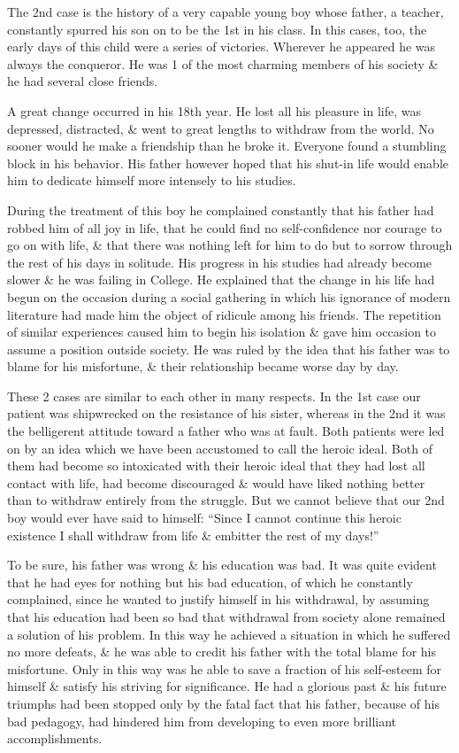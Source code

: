 \documentclass{article}
\begin{document}
The 2nd case is the history of a very capable young boy whose father, a teacher, constantly spurred his son on to be the 1st in his class. In this cases, too, the early days of this child were a series of victories. Wherever he appeared he was always the conqueror. He was 1 of the most charming members of his society \& he had several close friends.

A great change occurred in his 18th year. He lost all his pleasure in life, was depressed, distracted, \& went to great lengths to withdraw from the world. No sooner would he make a friendship than he broke it. Everyone found a stumbling block in his behavior. His father however hoped that his shut-in life would enable him to dedicate himself more intensely to his studies.

During the treatment of this boy he complained constantly that his father had robbed him of all joy in life, that he could find no self-confidence nor courage to go on with life, \& that there was nothing left for him to do but to sorrow through the rest of his days in solitude. His progress in his studies had already become slower \& he was failing in College. He explained that the change in his life had begun on the occasion during a social gathering in which his ignorance of modern literature had made him the object of ridicule among his friends. The repetition of similar experiences caused him to begin his isolation \& gave him occasion to assume a position outside society. He was ruled by the idea that his father was to blame for his misfortune, \& their relationship became worse day by day.

These 2 cases are similar to each other in many respects. In the 1st case our patient was shipwrecked on the resistance of his sister, whereas in the 2nd it was the belligerent attitude toward a father who was at fault. Both patients were led on by an idea which we have been accustomed to call the heroic ideal. Both of them had become so intoxicated with their heroic ideal that they had lost all contact with life, had become discouraged \& would have liked nothing better than to withdraw entirely from the struggle. But we cannot believe that our 2nd boy would ever have said to himself: ``Since I cannot continue this heroic existence I shall withdraw from life \& embitter the rest of my days!''

To be sure, his father was wrong \& his education was bad. It was quite evident that he had eyes for nothing but his bad education, of which he constantly complained, since he wanted to justify himself in his withdrawal, by assuming that his education had been so bad that withdrawal from society alone remained a solution of his problem. In this way he achieved a situation in which he suffered no more defeats, \& he was able to credit his father with the total blame for his misfortune. Only in this way was he able to save a fraction of his self-esteem for himself \& satisfy his striving for significance. He had a glorious past \& his future triumphs had been stopped only by the fatal fact that his father, because of his bad pedagogy, had hindered him from developing to even more brilliant accomplishments.
\end{document}
